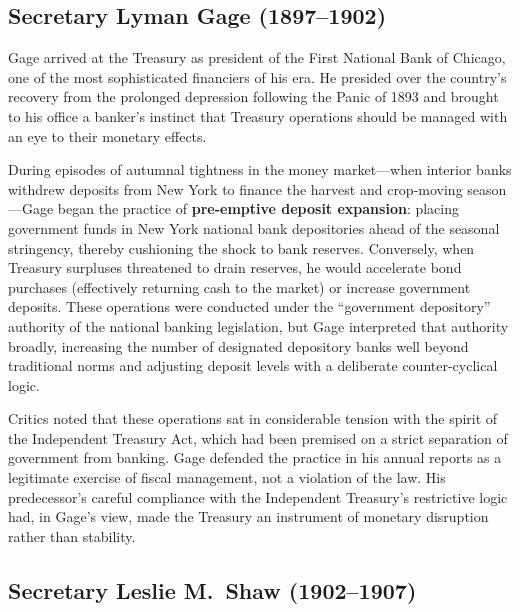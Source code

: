 \documentclass[12pt]{article}
\begin{document}
\subsection{Secretary Lyman Gage (1897--1902)}

Gage arrived at the Treasury as president of the First National Bank of
Chicago, one of the most sophisticated financiers of his era.  He
presided over the country's recovery from the prolonged depression
following the Panic of 1893 and brought to his office a banker's
instinct that Treasury operations should be managed with an eye to
their monetary effects.

During episodes of autumnal tightness in the money market---when
interior banks withdrew deposits from New York to finance the harvest
and crop-moving season---Gage began the practice of \textbf{pre-emptive
deposit expansion}: placing government funds in New York national bank
depositories ahead of the seasonal stringency, thereby cushioning the
shock to bank reserves.  Conversely, when Treasury surpluses threatened
to drain reserves, he would accelerate bond purchases (effectively
returning cash to the market) or increase government deposits.  These
operations were conducted under the ``government depository'' authority
of the national banking legislation, but Gage interpreted that authority
broadly, increasing the number of designated depository banks well
beyond traditional norms and adjusting deposit levels with a deliberate
counter-cyclical logic.

Critics noted that these operations sat in considerable tension with the
spirit of the Independent Treasury Act, which had been premised on a
strict separation of government from banking.  Gage defended the
practice in his annual reports as a legitimate exercise of fiscal
management, not a violation of the law.  His predecessor's careful
compliance with the Independent Treasury's restrictive logic had, in
Gage's view, made the Treasury an instrument of monetary disruption
rather than stability.

\subsection{Secretary Leslie M.\ Shaw (1902--1907)}
\end{document}
